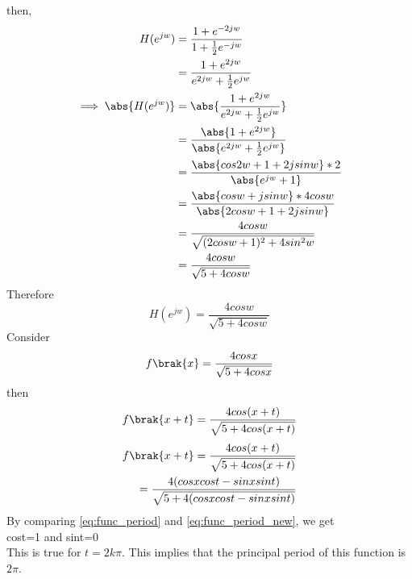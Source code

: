 \documentclass[journal,12pt,twocolumn]{IEEEtran}
\renewcommand\thesection{\arabic{section}}
\begin{document}
\begin{enumerate}[label=\thesection.\arabic*]
then,
\begin{align}
	H(e^{jw}) &=  \frac{1 + e^{-2jw}}{1 + \frac{1}{2}e^{-jw}}
	\\&= \frac{1 + e^{2jw}}{e^{2jw} + \frac{1}{2}e^{jw}}
	\\ \implies \abs{H(e^{jw})} &= \abs{\frac{1 + e^{2jw}}{e^{2jw} + \frac{1}{2}e^{jw}} }
	\\&= \frac{\abs{1 + e^{2jw}}}{\abs{e^{2jw} + \frac{1}{2}e^{jw}}}
	\\&= \frac{\abs{cos2w+1+2jsinw}*2}{\abs{e^{jw} + 1}}
	\\&= \frac{\abs{cosw+jsinw}*4cosw}{\abs{2cosw+1+2jsinw}}
	\\&= \frac{4cosw}{\sqrt{(2cosw+1)^{2}+4sin^{2}w}}
	\\&= \frac{4cosw}{\sqrt{5+4cosw}}
\end{align}
Therefore 
\begin{equation}
	H(e^{jw}) = \frac{4cosw}{\sqrt{5+4cosw}}
\end{equation}
Consider 
\begin{equation}
	\label{eq:func_period}
	f\brak{x}=\frac{4cosx}{\sqrt{5+4cosx}}
\end{equation}
then
\begin{equation}
	\label{eq:func_period_new}
	f\brak{x+t}=\frac{4cos(x+t)}{\sqrt{5+4cos(x+t)}}
\end{equation}
\begin{align}
	f\brak{x+t}=\frac{4cos(x+t)}{\sqrt{5+4cos(x+t)}}
	\\=\frac{4(cosxcost-sinxsint)}{\sqrt{5+4(cosxcost-sinxsint)}}
\end{align}
By comparing \eqref{eq:func_period} and \eqref{eq:func_period_new}, we get\\
cost=1 and sint=0
\\This is true for $t=2k\pi$. This implies that the principal period of this function is $2\pi$.




\end{enumerate}
\end{document}
